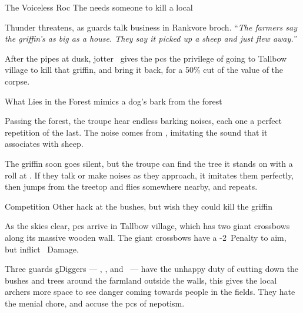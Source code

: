 \documentclass[10pt,twoside]{book}
\begin{document}




\pagestyle{minizine}%

{The Voiceless Roc}%
{The  needs someone to kill a local }%

Thunder threatens, as \glspl{guard} talk business in Rankvore \gls{broch}.
``\textit{The farmers say the \gls{griffin}'s as big as a house.
They say it picked up a sheep and just flew away.''}

After the pipes at dusk, \gls{jotter} \composeHumanName\ gives the \glspl{pc} the privilege of going to Tallbow \gls{village} to kill that \gls{griffin}, and bring it back, for a 50\% cut of the value of the corpse.

{What Lies in the Forest}%
{ mimics a dog's bark from the forest}%

Passing the forest, the troupe hear endless barking noises, each one a perfect repetition of the last.
The noise comes from , imitating the sound that it associates with sheep.

The \gls{griffin} soon goes silent, but the troupe can find the tree it stands on with a  roll at \tn[8].
If they talk or make noises as they approach, it imitates them perfectly, then jumps from the treetop and flies somewhere nearby, and repeats.

\begin{figure}[t]
\end{figure}%

{Competition}%
{Other  hack at the bushes, but wish they could kill the \gls{griffin}}%

As the skies clear, \glspl{pc} arrive in Tallbow \gls{village}, which has two giant \glspl{crossbow} along its massive wooden wall.
The giant \glspl{crossbow} have a -2~Penalty to aim, but inflict ~Damage.

Three \glspl{guard} \glspl{gDigger} --- \composeHumanName, \composeHumanName, and \composeHumanName\ --- have the unhappy duty of cutting down the bushes and trees around the farmland outside the walls, this gives the local archers more space to see danger coming towards people in the fields.
They hate the menial chore, and accuse the \glspl{pc} of nepotism.
\end{document}
